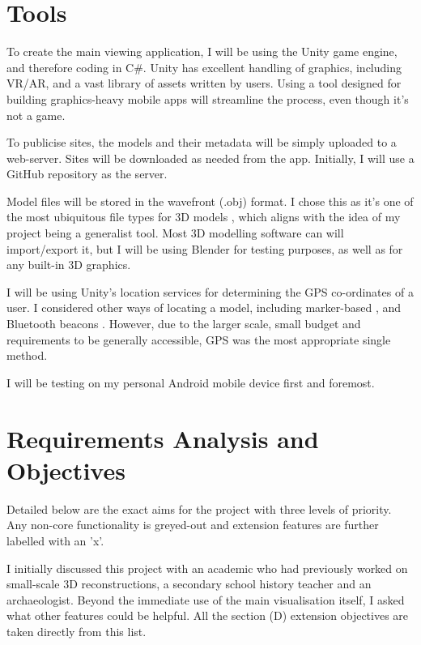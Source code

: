 \documentclass{article}
\begin{document}
\section{Tools}
To create the main viewing application, I will be using the Unity game engine, and therefore coding in C\#. Unity has excellent handling of graphics, including VR/AR, and a vast library of assets written by users. Using a tool designed for building graphics-heavy mobile apps will streamline the process, even though it's not a game. 

To publicise sites, the models and their metadata will be simply uploaded to a web-server. Sites will be downloaded as needed from the app. Initially, I will use a GitHub repository as the server.

Model files will be stored in the wavefront (.obj) format. I chose this as it's one of the most ubiquitous file types for 3D models \cite{obj1} \cite{obj2}, which aligns with the idea of my project being a generalist tool. Most 3D modelling software can will import/export it, but I will be using Blender for testing purposes, as well as for any built-in 3D graphics. 

I will be using Unity's location services for determining the GPS co-ordinates of a user. I considered other ways of locating a model, including marker-based \cite{anchor}, and Bluetooth beacons \cite{beacons}. However, due to the larger scale, small budget and requirements to be generally accessible, GPS was the most appropriate single method. 

I will be testing on my personal Android mobile device first and foremost. 

\section{Requirements Analysis and Objectives}
Detailed below are the exact aims for the project with three levels of priority. Any non-core functionality is greyed-out and extension features are further labelled with an 'x'.

I initially discussed this project with an academic who had previously worked on small-scale 3D reconstructions, a secondary school history teacher and an archaeologist. Beyond the immediate use of the main visualisation itself, I asked what other features could be helpful. All the section (D) extension objectives are taken directly from this list.
\end{document}
